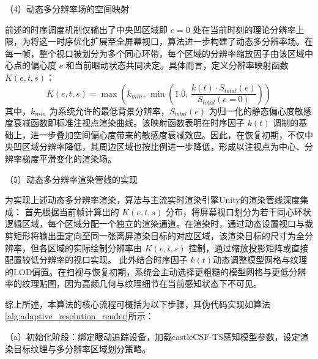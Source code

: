 （4）动态多分辨率场的空间映射

前述的时序调度机制仅输出了中央凹区域即 $e=0$ 处在当前时刻的理论分辨率上限，为将这一时序优化扩展至全屏幕视口，算法进一步构建了动态多分辨率场。在每一帧，整个视口被划分为多个同心环带，每个区域的分辨率缩放因子由该区域中心点的偏心度 \(e\) 和当前眼动状态共同决定。具体而言，定义分辨率映射函数 \(K(e, t, s)\)：
\begin{equation}
K(e, t, s) = \max \left( k_{min}, \, \min \left( 1.0, \, \frac{k(t) \cdot S_{total}(e)}{S_{total}(e=0)} \right) \right)
\label{eq:dynamic_resolution_field}
\end{equation}
其中，$k_{min}$ 为系统允许的最低背景分辨率，\(S_{total}(e)\) 为归一化的静态偏心度敏感度衰减函数即标准注视点渲染曲线\cite{1-2-1}。该映射函数表明在时序因子 \(k(t)\) 调制的基础上，进一步叠加空间偏心度带来的敏感度衰减效应。因此，在恢复初期，不仅中央凹区域分辨率降低，其周边区域也按比例进一步降低，形成以注视点为中心、分辨率梯度平滑变化的渲染场。

（5）动态多分辨率渲染管线的实现
 
为实现上述动态多分辨率渲染，算法与主流实时渲染引擎Unity的渲染管线深度集成：
首先根据当前帧计算出的 \(K(e, t, s)\) 分布，将屏幕视口划分为若干同心环状逻辑区域，每个区域分配一个独立的渲染通道。在渲染时，通过动态设置视口与裁剪矩形将输出重定向至同一张离屏渲染目标的对应区域，该渲染目标的尺寸为全分辨率，但各区域的实际绘制分辨率由  \(K(e, t, s)\) 控制，通过缩放投影矩阵或直接配置较低分辨率的视口实现。
此外结合时序因子 \(k(t)\)动态调整模型网格与纹理的LOD偏置。在扫视与恢复初期，系统会主动选择更粗糙的模型网格与更低分辨率的纹理贴图，因为高频几何与纹理细节在当前感知状态下不可见。



综上所述，本算法的核心流程可概括为以下步骤，其伪代码实现如算法\ref{alg:adaptive_resolution_render}所示：

（a）初始化阶段：绑定眼动追踪设备，加载castleCSF-TS感知模型参数，设定渲染目标纹理与多分辨率区域划分策略。

